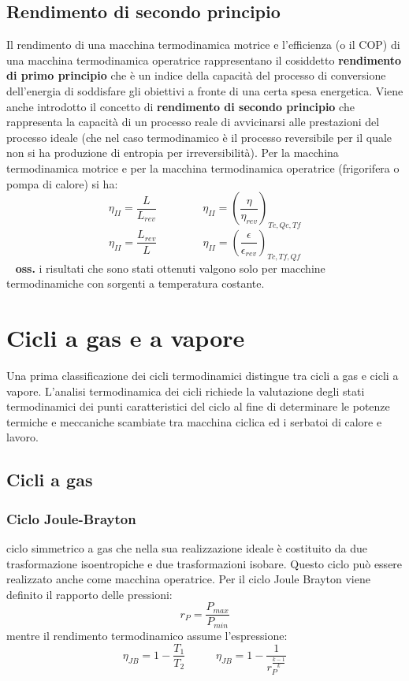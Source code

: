 \subsection{Rendimento di secondo principio}
Il rendimento di una macchina termodinamica motrice e l’efficienza (o il COP) di una
macchina termodinamica operatrice rappresentano il cosiddetto \textbf{rendimento di primo
principio} che è un indice della capacità del processo di conversione dell’energia di soddisfare
gli obiettivi a fronte di una certa spesa energetica. \newline
\newline
Viene anche introdotto il concetto di \textbf{rendimento di secondo principio} che rappresenta la
capacità di un processo reale di avvicinarsi alle prestazioni del processo ideale (che nel caso
termodinamico è il processo reversibile per il quale non si ha produzione di entropia per
irreversibilità). Per la macchina termodinamica motrice e per la macchina termodinamica
operatrice (frigorifera o pompa di calore) si ha: 
\[
    \eta_{II} = \frac{L}{L_{rev}} \;\;\;\;\;\;\;\;\;\;\;\;\;\;\; \eta_{II} = \left(\frac{\eta}{\eta_{rev}}\right)_{Tc, Qc, Tf}
\]
\[
    \eta_{II} = \frac{L_{rev}}{L} \;\;\;\;\;\;\;\;\;\;\;\;\;\;\; \eta_{II} = \left(\frac{\epsilon}{\epsilon_{rev}}\right)_{Tc,Tf,Qf}
\]
\ \newline
\textbf{oss.} i risultati che sono stati ottenuti valgono solo per macchine termodinamiche con
sorgenti a temperatura costante. 
\section{Cicli a gas e a vapore}
Una prima classificazione dei cicli termodinamici distingue tra cicli a gas e cicli a vapore.
L’analisi termodinamica dei cicli richiede la valutazione degli stati termodinamici dei punti
caratteristici del ciclo al fine di determinare le potenze termiche e meccaniche scambiate tra
macchina ciclica ed i serbatoi di calore e lavoro.
\subsection{Cicli a gas}
\subsubsection{Ciclo Joule-Brayton}
ciclo simmetrico a gas che nella sua realizzazione ideale è costituito da
due trasformazione isoentropiche e due trasformazioni isobare. Questo ciclo può essere
realizzato anche come macchina operatrice. \newline
Per il ciclo Joule Brayton viene definito il rapporto delle pressioni:
\[
    r_P = \frac{P_{max}}{P_{min}}
\]
mentre il rendimento termodinamico assume l'espressione:
\[
    \eta_{JB} = 1- \frac{T_1}{T_2} \;\;\;\;\;\;\;\;\;\;\eta_{JB} = 1- \frac{1}{r_P^{\frac{k-1}{k}}}
\]
